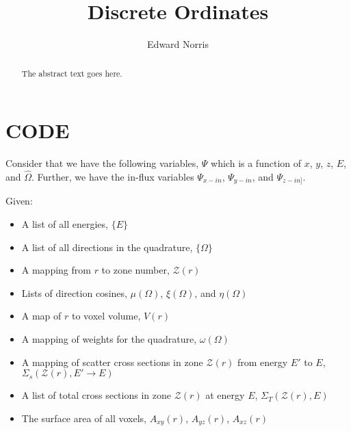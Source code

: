 \documentclass{article}
\numberwithin{equation}{subsection}
\begin{document}
\title{Discrete Ordinates}
\author{Edward Norris}

\maketitle

\begin{abstract}
The abstract text goes here.
\end{abstract}

\tableofcontents

\section{CODE}
Consider that we have the following variables, $\Psi$ which is a function of $x$, $y$, $z$, $E$, and $\hat{\Omega}$. Further, we have the in-flux variables $\Psi_{x-in}$, $\Psi_{y-in}$, and $\Psi_{z-in]}$. 

Given:
\begin{itemize}
\item A list of all energies, $\{E\}$
\item A list of all directions in the quadrature, $\{\Omega\}$
\item A mapping from $r$ to zone number, $\mathcal{Z}(r)$
\item Lists of direction cosines, $\mu(\Omega)$, $\xi(\Omega)$, and $\eta(\Omega)$
\item A map of $r$ to voxel volume, $V(r)$
\item A mapping of weights for the quadrature, $\omega(\Omega)$
\item A mapping of scatter cross sections in zone $\mathcal{Z}(r)$ from energy $E'$ to $E$, $\Sigma_s(\mathcal{Z}(r), E' \rightarrow E)$
\item A list of total cross sections in zone $\mathcal{Z}(r)$ at energy $E$, $\Sigma_T(\mathcal{Z}(r), E)$
\item The surface area of all voxels, $A_{xy}(r)$, $A_{yz}(r)$, $A_{xz}(r)$
\end{itemize}
\end{document}
